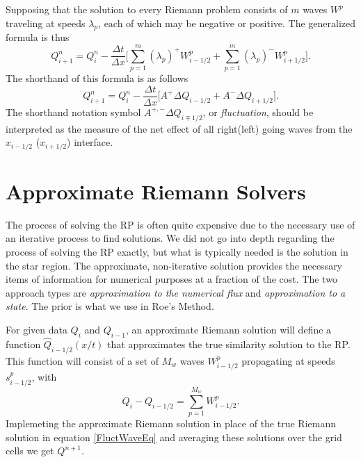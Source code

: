 \documentclass[]{article}
\begin{document}
	Supposing that the solution to every Riemann problem consists of $ m $ waves $ W^p $ traveling at speeds $ \lambda_p $, each of which may be negative or positive. The generalized formula is thus
	\begin{equation}
		Q^n_{i+1} = Q_i^n - \frac{\Delta t}{\Delta x} \Big[\sum_{p = 1}^{m} (\lambda_p)^+ W^p_{i-1/2} + \sum_{p = 1}^{m}(\lambda_p)^- W^p_{i+1/2} \Big].
	\end{equation}
	The shorthand of this formula is as follows	
	\begin{equation}
		Q^n_{i+1} = Q_i^n - \frac{\Delta t}{\Delta x} \Big[A^+\Delta Q_{i-1/2} + A^-\Delta Q_{i+1/2} \Big].
		\label{FluctWaveEq}
	\end{equation}
	The shorthand notation symbol $ A^{+,-} \Delta Q_{i\mp1/2}$, or \textit{fluctuation}, should be interpreted as the measure of the net effect of all right(left) going waves from the $ x_{i-1/2} $ ($ x_{i+1/2} $) interface.
	 

\section{Approximate Riemann Solvers}
	The process of solving the RP is often quite expensive due to the necessary use of an iterative process to find solutions. We did not go into depth regarding the process of solving the RP exactly, but what is typically needed is the solution in the star region.  The approximate, non-iterative solution provides the necessary items of information for numerical purposes at a fraction of the cost. The two approach types are \textit{approximation to the numerical flux} and \textit{approximation to a state}. The prior is what we use in Roe's Method. 

	For given data $ Q_{i} $ and $ Q_{i-1} $, an approximate Riemann solution will define a function $ \hat{Q}_{i-1/2}(x/t) $ that approximates the true similarity solution to the RP. This function will consist of a set of $ M_w $ waves $ W^p_{i-1/2} $ propagating at speeds $ s^p_{i-1/2} $, with
	\begin{equation}
		Q_i - Q_{i-1/2} = \sum_{p = 1}^{M_w} W^p_{i-1/2}.
	\end{equation}
	Implemeting the approximate Riemann solution in place of the true Riemann solution in equation \ref{FluctWaveEq} and averaging these solutions over the grid cells we get $ Q^{n+1} $.
	
\end{document}

